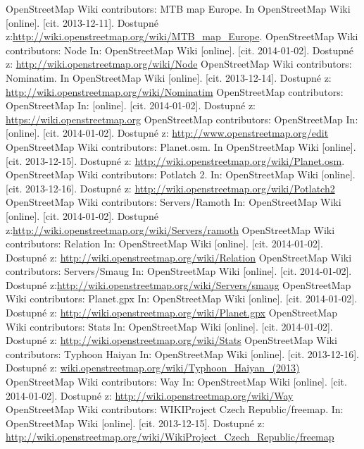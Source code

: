 \documentclass[11pt,a4paper,titlepage,oneside]{book}
\begin{document}
\begin{thebibliography}{99}
	OpenStreetMap Wiki contributors:  MTB map Europe. In OpenStreetMap Wiki [online]. [cit. 2013-12-11]. Dostupné z:\url{http://wiki.openstreetmap.org/wiki/MTB_map_Europe}.
	OpenStreetMap Wiki contributors: Node In: OpenStreetMap Wiki [online]. [cit. 2014-01-02]. Dostupné z: \url{http://wiki.openstreetmap.org/wiki/Node}
	OpenStreetMap Wiki contributors: Nominatim. In OpenStreetMap Wiki [online]. [cit. 2013-12-14]. Dostupné z: \url{http://wiki.openstreetmap.org/wiki/Nominatim}	
	OpenStreetMap contributors: OpenStreetMap In:  [online]. [cit. 2014-01-02]. Dostupné z:	\url{https://wiki.openstreetmap.org}
	OpenStreetMap contributors: OpenStreetMap In:  [online]. [cit. 2014-01-02]. Dostupné z:	\url{http://www.openstreetmap.org/edit}
	OpenStreetMap Wiki contributors: Planet.osm. In OpenStreetMap Wiki [online]. [cit. 2013-12-15]. Dostupné z: \url{http://wiki.openstreetmap.org/wiki/Planet.osm}.
	OpenStreetMap Wiki contributors: Potlatch 2. In: OpenStreetMap Wiki [online]. [cit. 2013-12-16]. Dostupné z:  \url{http://wiki.openstreetmap.org/wiki/Potlatch2}
	OpenStreetMap Wiki contributors: Servers/Ramoth In: OpenStreetMap Wiki [online]. [cit. 2014-01-02]. Dostupné z:\url{http://wiki.openstreetmap.org/wiki/Servers/ramoth}
	OpenStreetMap Wiki contributors: Relation In: OpenStreetMap Wiki [online]. [cit. 2014-01-02]. Dostupné z: \url{http://wiki.openstreetmap.org/wiki/Relation}
	OpenStreetMap Wiki contributors: Servers/Smaug In: OpenStreetMap Wiki [online]. [cit. 2014-01-02]. Dostupné z:\url{http://wiki.openstreetmap.org/wiki/Servers/smaug}
	OpenStreetMap Wiki contributors: Planet.gpx In: OpenStreetMap Wiki [online]. [cit. 2014-01-02]. Dostupné z: \url{http://wiki.openstreetmap.org/wiki/Planet.gpx}
	OpenStreetMap Wiki contributors: Stats In: OpenStreetMap Wiki [online]. [cit. 2014-01-02]. Dostupné z: \url{http://wiki.openstreetmap.org/wiki/Stats}
	OpenStreetMap Wiki contributors: Typhoon Haiyan In: OpenStreetMap Wiki [online]. [cit. 2013-12-16]. Dostupné z: \url{wiki.openstreetmap.org/wiki/Typhoon_Haiyan_(2013)}
	OpenStreetMap Wiki contributors: Way In: OpenStreetMap Wiki [online]. [cit. 2014-01-02]. Dostupné z: \url{http://wiki.openstreetmap.org/wiki/Way}
	OpenStreetMap Wiki contributors: WIKIProject Czech Republic/freemap. In: OpenStreetMap Wiki [online]. [cit. 2013-12-15]. Dostupné z:  \url{http://wiki.openstreetmap.org/wiki/WikiProject_Czech_Republic/freemap}

\end{thebibliography}
\end{document}

